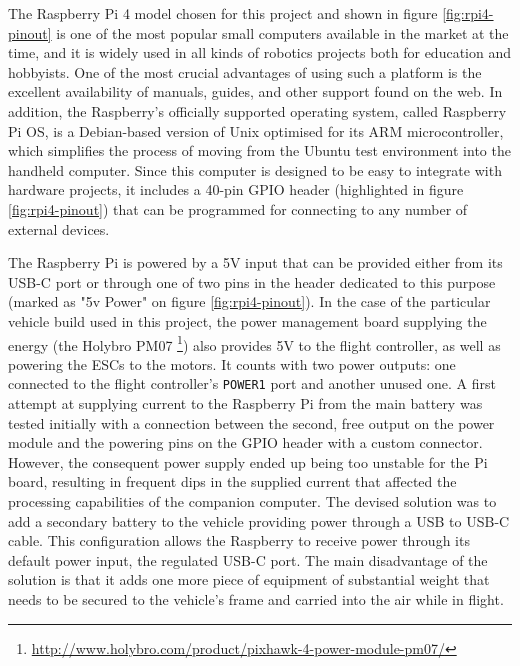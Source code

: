 The Raspberry Pi 4 model chosen for this project and shown in figure \ref{fig:rpi4-pinout} is one of the most popular small computers available in the market at the time, and it is widely used in all kinds of robotics projects both for education and hobbyists.
One of the most crucial advantages of using such a platform is the excellent availability of manuals, guides, and other support found on the web.
In addition, the Raspberry's officially supported operating system, called Raspberry Pi OS, is a Debian-based version of Unix optimised for its ARM microcontroller, which simplifies the process of moving from the Ubuntu test environment into the handheld computer.
Since this computer is designed to be easy to integrate with hardware projects, it includes a 40-pin GPIO header (highlighted in figure \ref{fig:rpi4-pinout}) that can be programmed for connecting to any number of external devices.

The Raspberry Pi is powered by a 5V input that can be provided either from its USB-C port or through one of two pins in the header dedicated to this purpose (marked as "5v Power" on figure \ref{fig:rpi4-pinout}).
In the case of the particular vehicle build used in this project, the power management board supplying the energy (the Holybro PM07 \footnote{\url{http://www.holybro.com/product/pixhawk-4-power-module-pm07/}}) also provides 5V to the flight controller, as well as powering the ESCs to the motors.
It counts with two power outputs: one connected to the flight controller's \texttt{POWER1} port and another unused one.
A first attempt at supplying current to the Raspberry Pi from the main battery was tested initially with a connection between the second, free output on the power module and the powering pins on the GPIO header with a custom connector.
However, the consequent power supply ended up being too unstable for the Pi board, resulting in frequent dips in the supplied current that affected the processing capabilities of the companion computer.
The devised solution was to add a secondary battery to the vehicle providing power through a USB to USB-C cable.
This configuration allows the Raspberry to receive power through its default power input, the regulated USB-C port.
The main disadvantage of the solution is that it adds one more piece of equipment of substantial weight that needs to be secured to the vehicle's frame and carried into the air while in flight.

